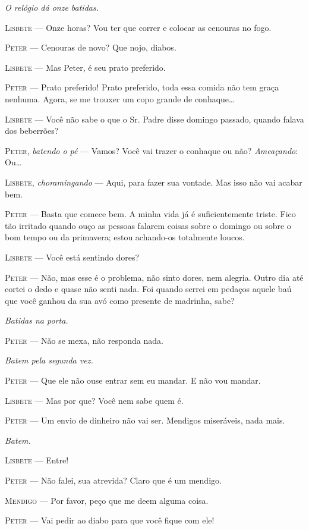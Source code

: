 \begin{myparindent}{0pt}
\begin{Parskip}
\emph{O relógio dá onze batidas.}

\textsc{Lisbete} --- Onze horas? Vou ter que correr e colocar as cenouras no fogo.

\textsc{Peter} --- Cenouras de novo? Que nojo, diabos.

\textsc{Lisbete} --- Mas Peter, é seu prato preferido.

\textsc{Peter} --- Prato preferido! Prato preferido, toda essa comida não tem
graça nenhuma. Agora, se me trouxer um copo grande de conhaque\ldots{}

\textsc{Lisbete} --- Você não sabe o que o Sr. Padre disse domingo passado, quando
falava dos beberrões?

\textsc{Peter}, \emph{batendo o pé} --- Vamos? Você vai trazer o conhaque ou não?
\emph{Ameaçando}: Ou\ldots{}

\textsc{Lisbete}, \emph{choramingando} --- Aqui, para fazer sua vontade. Mas isso
não vai acabar bem.

\textsc{Peter} --- Basta que comece bem. A minha vida já é suficientemente triste.
Fico tão irritado quando ouço as pessoas falarem coisas sobre o domingo
ou sobre o bom tempo ou da primavera; estou achando-os totalmente
loucos.

\textsc{Lisbete} --- Você está sentindo dores?

\textsc{Peter} --- Não, mas esse é o problema, não sinto dores, nem alegria. Outro
dia até cortei o dedo e quase não senti nada. Foi quando serrei em
pedaços aquele baú que você ganhou da sua avó como presente de madrinha,
sabe?

\emph{Batidas na porta.}

\textsc{Peter} --- Não se mexa, não responda nada.

\emph{Batem pela segunda vez.}

\textsc{Peter} --- Que ele não ouse entrar sem eu mandar. E não vou mandar.

\textsc{Lisbete} --- Mas por que? Você nem sabe quem é.

\textsc{Peter} --- Um envio de dinheiro não vai ser. Mendigos miseráveis, nada
mais.

\emph{Batem.}

\textsc{Lisbete} --- Entre!

\textsc{Peter} --- Não falei, sua atrevida? Claro que é um mendigo.

\textsc{Mendigo} --- Por favor, peço que me deem alguma coisa.

\textsc{Peter} --- Vai pedir ao diabo para que você fique com ele!


\end{Parskip}
\end{myparindent}

